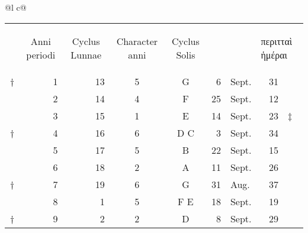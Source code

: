 %
\footnotesize
\centering
\setlength{\tabcolsep}{0.5em}
\begin{tabular}{@{}l c@{}}
\toprule
 \\
\midrule
\addlinespace

\begin{tabular}[t]{@{}r rrcc r@{~}l r l@{}}
~ &
\multicolumn{1}{c}{\begin{rotate}{60}Anni periodi\end{rotate}} &
\multicolumn{1}{c}{\begin{rotate}{60}Cyclus Lunnae\end{rotate}} &
\multicolumn{1}{c}{\begin{rotate}{60}Character anni\end{rotate}} &
\multicolumn{1}{c}{\begin{rotate}{60}Cyclus Solis\end{rotate}} &
& &
\multicolumn{2}{l}{\begin{turn}{60}\textgreek{περιτταὶ ἡμέραι}\end{turn}}
\\
\cmidrule{2-8}
† &  1 & 13 &  5 &  G  &  6 &Sept. & 31 & ~ \\
~ &  2 & 14 &  4 &  F  & 25 & Sept. & 12 & ~ \\
~ &  3 & 15 &  1 &  E  & 14 & Sept. & 23 & ‡ \\
† &  4 & 16 &  6 & D C &  3 & Sept. & 34 & ~ \\
\cmidrule{2-8}
~ &  5 & 17 &  5 &  B  & 22 & Sept. & 15 \\
~ &  6 & 18 &  2 &  A  & 11 & Sept. & 26 \\
† &  7 & 19 &  6 &  G  & 31 & Aug.  & 37 \\
~ &  8 &  1 &  5 & F E & 18 & Sept. & 19 \\
\cmidrule{2-8}
† &  9 &  2 &  2 &  D  &  8 & Sept. & 29 & ~\\

\end{tabular}
\end{tabular}
